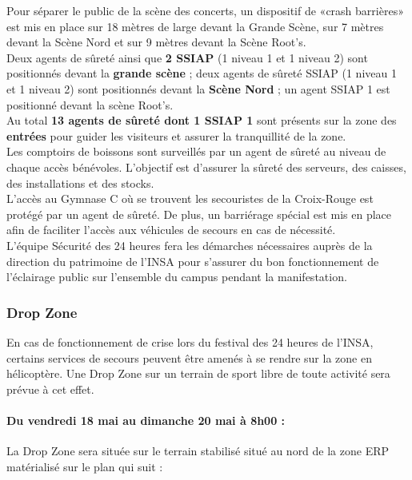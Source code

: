 \documentclass[hidelinks, paper=a4, fontsize=13pt]{report}
\begin{document}
Pour séparer le public de la scène des concerts, un dispositif de «crash barrières» est mis en place sur 18 mètres de large devant la Grande Scène, sur 7 mètres devant la Scène Nord et sur 9 mètres devant la Scène Root's. \\

Deux agents de sûreté ainsi que \textbf{2 SSIAP} (1 niveau 1 et 1 niveau 2) sont positionnés devant la \textbf{grande scène} ; deux agents de sûreté SSIAP (1 niveau 1 et 1 niveau 2) sont positionnés devant la \textbf{Scène Nord} ; un agent SSIAP 1 est positionné devant la scène Root's.\\

Au total \textbf{13 agents de sûreté dont 1 SSIAP 1} sont présents sur la zone des \textbf{entrées} pour guider les visiteurs et assurer la tranquillité de la zone.\\

Les comptoirs de boissons sont surveillés par un agent de sûreté au niveau de chaque accès bénévoles. L’objectif est d’assurer la sûreté des serveurs, des caisses, des installations et des stocks.\\

L’accès au Gymnase C où se trouvent les secouristes de la Croix-Rouge est protégé par un agent de sûreté. De plus, un barriérage spécial est mis en place afin de faciliter l’accès aux véhicules de secours en cas de nécessité.\\

L’équipe Sécurité des 24 heures fera les démarches nécessaires auprès de la direction du patrimoine de l’INSA pour s’assurer du bon fonctionnement de l’éclairage public sur l’ensemble du campus pendant la manifestation.


\subsubsection{Drop Zone}

En cas de fonctionnement de crise lors du festival des 24 heures de l’INSA, certains services de secours peuvent être amenés à se rendre sur la zone en hélicoptère. 
Une Drop Zone sur un terrain de sport libre de toute activité sera prévue à cet effet. 

\paragraph{Du vendredi 18 mai au dimanche 20 mai à 8h00 :}

La Drop Zone sera située sur le terrain stabilisé situé au nord de la zone ERP matérialisé sur le plan qui suit :
\end{document}
